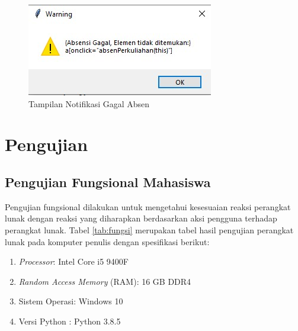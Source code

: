\begin{figure}[H]
	\centering
	\includegraphics[scale=0.7]{Gambar/gagalAbsen.jpg}
	\caption{Tampilan Notifikasi Gagal Absen} 
	\label{fig:absenGagal}
\end{figure}

\section{Pengujian}
\label{sec:pengujian} 

\subsection{Pengujian Fungsional Mahasiswa}
Pengujian fungsional dilakukan untuk mengetahui kesesuaian reaksi perangkat lunak dengan reaksi yang diharapkan berdasarkan aksi pengguna terhadap perangkat lunak. Tabel \ref{tab:fungsi} merupakan tabel hasil pengujian perangkat lunak pada komputer penulis dengan spesifikasi berikut:
\begin{enumerate}
	\item \textit{Processor}: Intel Core i5 9400F
	\item \textit{Random Access Memory} (RAM): 16 GB DDR4
	\item Sistem Operasi: Windows 10
	\item Versi Python : Python 3.8.5
\end{enumerate}

